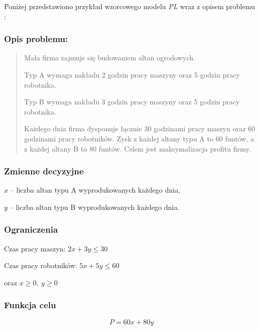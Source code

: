 
Poniżej przedstawiono przykład wzorcowego modelu \textit{PL} wraz z opisem problemu \cite{cimt}:

\subsubsection*{Opis problemu:} \label{sec:model_example}
\begin{quote}
Mała firma zajmuje się budowaniem altan ogrodowych.

Typ A wymaga nakładu 2 godzin pracy maszyny oraz 5 godzin pracy robotnika.  

Typ B wymaga nakładu 3 godzin pracy maszyny oraz 5 godzin pracy robotnika. 

Każdego dnia firma dysponuje łącznie 30 godzinami pracy maszyn oraz 60 godzinami pracy robotników. Zysk z każdej altany typu A to 60 funtów, a z każdej altany B to 80 funtów. Celem jest maksymalizacja profitu firmy.

\end{quote}

\subsubsection*{Zmienne decyzyjne}

$x$ – liczba altan typu A wyprodukowanych każdego dnia,

$y$ – liczba altan typu B wyprodukowanych każdego dnia.

\subsubsection*{Ograniczenia}

Czas pracy maszyn: $2x + 3y \leq 30$

Czas pracy robotników: $5x + 5y \leq 60$

oraz $x \geq 0, \ y \geq 0$


\subsubsection*{Funkcja celu}
\[
    P = 60x + 80y
\]

